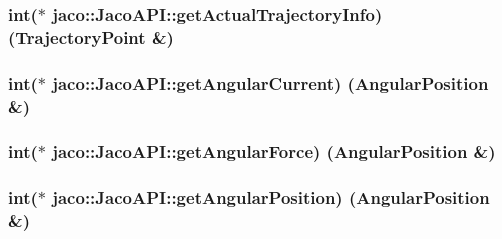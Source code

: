 \subsubsection[{\texorpdfstring{get\+Actual\+Trajectory\+Info}{getActualTrajectoryInfo}}]{\setlength{\rightskip}{0pt plus 5cm}int($\ast$ jaco\+::\+Jaco\+A\+P\+I\+::get\+Actual\+Trajectory\+Info) ({\bf Trajectory\+Point} \&)}\hypertarget{classjaco_1_1JacoAPI_af2f83a5e6bef4f10dc4c7d714a593e4c}{}\label{classjaco_1_1JacoAPI_af2f83a5e6bef4f10dc4c7d714a593e4c}
\subsubsection[{\texorpdfstring{get\+Angular\+Current}{getAngularCurrent}}]{\setlength{\rightskip}{0pt plus 5cm}int($\ast$ jaco\+::\+Jaco\+A\+P\+I\+::get\+Angular\+Current) ({\bf Angular\+Position} \&)}\hypertarget{classjaco_1_1JacoAPI_ac24c226ba8ee3b72618a84eaab9d722a}{}\label{classjaco_1_1JacoAPI_ac24c226ba8ee3b72618a84eaab9d722a}
\subsubsection[{\texorpdfstring{get\+Angular\+Force}{getAngularForce}}]{\setlength{\rightskip}{0pt plus 5cm}int($\ast$ jaco\+::\+Jaco\+A\+P\+I\+::get\+Angular\+Force) ({\bf Angular\+Position} \&)}\hypertarget{classjaco_1_1JacoAPI_aea22577840f066fb2d5da409e50f9760}{}\label{classjaco_1_1JacoAPI_aea22577840f066fb2d5da409e50f9760}
\subsubsection[{\texorpdfstring{get\+Angular\+Position}{getAngularPosition}}]{\setlength{\rightskip}{0pt plus 5cm}int($\ast$ jaco\+::\+Jaco\+A\+P\+I\+::get\+Angular\+Position) ({\bf Angular\+Position} \&)}\hypertarget{classjaco_1_1JacoAPI_a8d2e9b00c5953e3fc024f86e128f01df}{}\label{classjaco_1_1JacoAPI_a8d2e9b00c5953e3fc024f86e128f01df}
